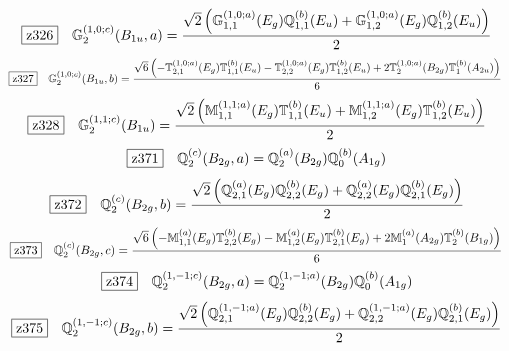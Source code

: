 \documentclass[fleqn,10pt,landscape]{jsarticle}
\begin{document}
\begin{dmath*}
\hspace*{3mm}\fbox{z326}\quad \mathbb{G}_{2}^{(1,0;c)}(B_{1u},a)=\frac{\sqrt{2} \left(\mathbb{G}_{1,1}^{(1,0;a)}(E_{g}) \mathbb{Q}_{1,1}^{(b)}(E_{u}) + \mathbb{G}_{1,2}^{(1,0;a)}(E_{g}) \mathbb{Q}_{1,2}^{(b)}(E_{u})\right)}{2}
\end{dmath*}
\begin{dmath*}
\hspace*{3mm}\fbox{z327}\quad \mathbb{G}_{2}^{(1,0;c)}(B_{1u},b)=\frac{\sqrt{6} \left(- \mathbb{T}_{2,1}^{(1,0;a)}(E_{g}) \mathbb{T}_{1,1}^{(b)}(E_{u}) - \mathbb{T}_{2,2}^{(1,0;a)}(E_{g}) \mathbb{T}_{1,2}^{(b)}(E_{u}) + 2 \mathbb{T}_{2}^{(1,0;a)}(B_{2g}) \mathbb{T}_{1}^{(b)}(A_{2u})\right)}{6}
\end{dmath*}
\begin{dmath*}
\hspace*{3mm}\fbox{z328}\quad \mathbb{G}_{2}^{(1,1;c)}(B_{1u})=\frac{\sqrt{2} \left(\mathbb{M}_{1,1}^{(1,1;a)}(E_{g}) \mathbb{T}_{1,1}^{(b)}(E_{u}) + \mathbb{M}_{1,2}^{(1,1;a)}(E_{g}) \mathbb{T}_{1,2}^{(b)}(E_{u})\right)}{2}
\end{dmath*}
\begin{dmath*}
\hspace*{3mm}\fbox{z371}\quad \mathbb{Q}_{2}^{(c)}(B_{2g},a)=\mathbb{Q}_{2}^{(a)}(B_{2g}) \mathbb{Q}_{0}^{(b)}(A_{1g})
\end{dmath*}
\begin{dmath*}
\hspace*{3mm}\fbox{z372}\quad \mathbb{Q}_{2}^{(c)}(B_{2g},b)=\frac{\sqrt{2} \left(\mathbb{Q}_{2,1}^{(a)}(E_{g}) \mathbb{Q}_{2,2}^{(b)}(E_{g}) + \mathbb{Q}_{2,2}^{(a)}(E_{g}) \mathbb{Q}_{2,1}^{(b)}(E_{g})\right)}{2}
\end{dmath*}
\begin{dmath*}
\hspace*{3mm}\fbox{z373}\quad \mathbb{Q}_{2}^{(c)}(B_{2g},c)=\frac{\sqrt{6} \left(- \mathbb{M}_{1,1}^{(a)}(E_{g}) \mathbb{T}_{2,2}^{(b)}(E_{g}) - \mathbb{M}_{1,2}^{(a)}(E_{g}) \mathbb{T}_{2,1}^{(b)}(E_{g}) + 2 \mathbb{M}_{1}^{(a)}(A_{2g}) \mathbb{T}_{2}^{(b)}(B_{1g})\right)}{6}
\end{dmath*}
\begin{dmath*}
\hspace*{3mm}\fbox{z374}\quad \mathbb{Q}_{2}^{(1,-1;c)}(B_{2g},a)=\mathbb{Q}_{2}^{(1,-1;a)}(B_{2g}) \mathbb{Q}_{0}^{(b)}(A_{1g})
\end{dmath*}
\begin{dmath*}
\hspace*{3mm}\fbox{z375}\quad \mathbb{Q}_{2}^{(1,-1;c)}(B_{2g},b)=\frac{\sqrt{2} \left(\mathbb{Q}_{2,1}^{(1,-1;a)}(E_{g}) \mathbb{Q}_{2,2}^{(b)}(E_{g}) + \mathbb{Q}_{2,2}^{(1,-1;a)}(E_{g}) \mathbb{Q}_{2,1}^{(b)}(E_{g})\right)}{2}
\end{dmath*}
\end{document}
